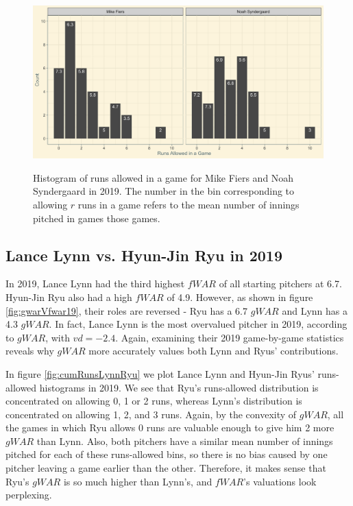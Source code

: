\documentclass[12pt]{article}
\begin{document}
\begin{figure}[t!]
\centering
\caption{Histogram of runs allowed in a game for Mike Fiers and Noah Syndergaard in 2019. The number in the bin corresponding to allowing $r$ runs in a game refers to the mean number of innings pitched in games those games.} 
\includegraphics[width=15cm]{../writeup_plots/plot_Fiers_Synderg_2019.png}
\label{fig:cumRunsFiersSynderg}
\end{figure}

\subsection{Lance Lynn vs. Hyun-Jin Ryu in 2019}

In 2019, Lance Lynn had the third highest $fWAR$ of all starting pitchers at 6.7. Hyun-Jin Ryu also had a high $fWAR$ of 4.9. However, as shown in figure \ref{fig:gwarVfwar19}, their roles are reversed - Ryu has a 6.7 $gWAR$ and Lynn has a 4.3 $gWAR$. In fact, Lance Lynn is the most overvalued pitcher in 2019, according to $gWAR$, with $vd = -2.4$. Again, examining their 2019 game-by-game statistics reveals why $gWAR$ more accurately values both Lynn and Ryus' contributions.

In figure \ref{fig:cumRunsLynnRyu} we plot Lance Lynn and Hyun-Jin Ryus' runs-allowed histograms in 2019. We see that Ryu's runs-allowed distribution is concentrated on allowing 0, 1 or 2 runs, whereas Lynn's distribution is concentrated on allowing 1, 2, and 3 runs. Again, by the convexity of $gWAR$, all the games in which Ryu allows 0 runs are valuable enough to give him 2 more $gWAR$ than Lynn. Also, both pitchers have a similar mean number of innings pitched for each of these runs-allowed bins, so there is no bias caused by one pitcher leaving a game earlier than the other. Therefore, it makes sense that Ryu's $gWAR$ is so much higher than Lynn's, and $fWAR$'s valuations look perplexing. 
\end{document}
